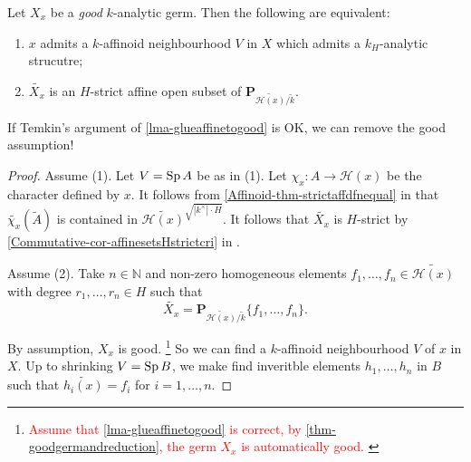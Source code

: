 \begin{lemma}\label{lma-khaffinoidnh}
    Let $X_x$ be a \emph{good} $k$-analytic germ. Then the following are equivalent:
    \begin{enumerate}
        \item $x$ admits a $k$-affinoid neighbourhood $V$ in $X$ which admits  a $k_H$-analytic strucutre;
        \item $\widetilde{X_x}$ is an $H$-strict affine open subset of $\mathbf{P}_{\widetilde{\mathscr{H}(x)}/\tilde{k}}$.
    \end{enumerate}
\end{lemma}
If Temkin's argument of \cref{lma-glueaffinetogood} is OK, we can remove the good assumption! 
\begin{proof}
    Assume (1). Let $V=\operatorname{Sp} A$ be as in (1). Let $\chi_x:A\rightarrow \mathscr{H}(x)$ be the character defined by $x$. It follows from \cref{Affinoid-thm-strictaffdfnequal} in  that $\widetilde{\chi_x}(\tilde{A})$ is contained in $\widetilde{\mathscr{H}(x)}^{\sqrt{|k^{\times}|\cdot H}}$. It follows that $\widetilde{X_x}$ is $H$-strict by \cref{Commutative-cor-affinesetsHstrictcri} in .

    Assume (2).  Take $n\in \mathbb{N}$ and non-zero homogeneous elements $f_1,\ldots,f_n\in \widetilde{\mathscr{H}(x)}$ with degree $r_1,\ldots,r_n\in H$ such that 
    \[
        \widetilde{X_x}=  \mathbf{P}_{\widetilde{\mathscr{H}(x)}/\tilde{k}}\{f_1,\ldots,f_n\}.
    \]
    
    By assumption, $X_x$ is good. \footnote{\textcolor{red}{Assume that \cref{lma-glueaffinetogood} is correct, by \cref{thm-goodgermandreduction}, the germ $X_x$ is automatically good. }}
    So we can find a $k$-affinoid neighbourhood $V$ of $x$ in $X$. Up to shrinking $V=\operatorname{Sp} B$, we make find inveritble elements $h_1,\ldots,h_n$ in $B$ such that $\widetilde{h_i(x)}=f_i$ for $i=1,\ldots,n$.


\end{proof}
